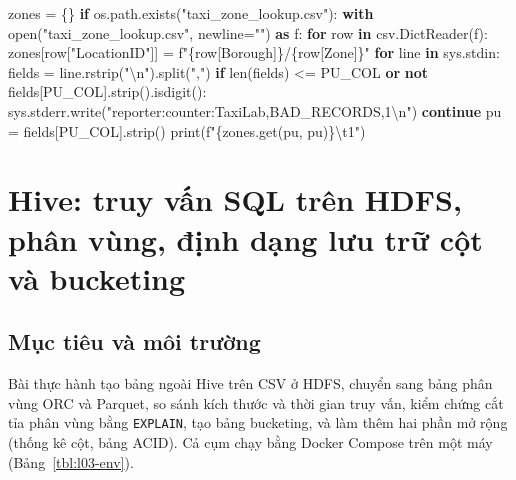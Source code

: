 \documentclass[
  12pt,
  a4paper,
]{report}
\newenvironment{Shaded}{}{}
\newcommand{\BuiltInTok}[1]{\textcolor[rgb]{0.00,0.50,0.00}{#1}}
\newcommand{\CharTok}[1]{\textcolor[rgb]{0.25,0.44,0.63}{#1}}
\newcommand{\ControlFlowTok}[1]{\textcolor[rgb]{0.00,0.44,0.13}{\textbf{#1}}}
\newcommand{\ImportTok}[1]{\textcolor[rgb]{0.00,0.50,0.00}{\textbf{#1}}}
\newcommand{\KeywordTok}[1]{\textcolor[rgb]{0.00,0.44,0.13}{\textbf{#1}}}
\newcommand{\NormalTok}[1]{#1}
\newcommand{\OperatorTok}[1]{\textcolor[rgb]{0.40,0.40,0.40}{#1}}
\newcommand{\SpecialCharTok}[1]{\textcolor[rgb]{0.25,0.44,0.63}{#1}}
\newcommand{\SpecialStringTok}[1]{\textcolor[rgb]{0.73,0.40,0.53}{#1}}
\newcommand{\StringTok}[1]{\textcolor[rgb]{0.25,0.44,0.63}{#1}}
\begin{document}
\begin{Shaded}
\begin{Highlighting}[]
\NormalTok{zones }\OperatorTok{=}\NormalTok{ \{\}}
\ControlFlowTok{if}\NormalTok{ os.path.exists(}\StringTok{"taxi\_zone\_lookup.csv"}\NormalTok{):}
    \ControlFlowTok{with} \BuiltInTok{open}\NormalTok{(}\StringTok{"taxi\_zone\_lookup.csv"}\NormalTok{, newline}\OperatorTok{=}\StringTok{""}\NormalTok{) }\ImportTok{as}\NormalTok{ f:}
        \ControlFlowTok{for}\NormalTok{ row }\KeywordTok{in}\NormalTok{ csv.DictReader(f):}
\NormalTok{            zones[row[}\StringTok{"LocationID"}\NormalTok{]] }\OperatorTok{=} \SpecialStringTok{f"}\SpecialCharTok{\{}\NormalTok{row[}\StringTok{\textquotesingle{}Borough\textquotesingle{}}\NormalTok{]}\SpecialCharTok{\}}\SpecialStringTok{/}\SpecialCharTok{\{}\NormalTok{row[}\StringTok{\textquotesingle{}Zone\textquotesingle{}}\NormalTok{]}\SpecialCharTok{\}}\SpecialStringTok{"}
\ControlFlowTok{for}\NormalTok{ line }\KeywordTok{in}\NormalTok{ sys.stdin:}
\NormalTok{    fields }\OperatorTok{=}\NormalTok{ line.rstrip(}\StringTok{"}\CharTok{\textbackslash{}n}\StringTok{"}\NormalTok{).split(}\StringTok{","}\NormalTok{)}
    \ControlFlowTok{if} \BuiltInTok{len}\NormalTok{(fields) }\OperatorTok{\textless{}=}\NormalTok{ PU\_COL }\KeywordTok{or} \KeywordTok{not}\NormalTok{ fields[PU\_COL].strip().isdigit():}
\NormalTok{        sys.stderr.write(}\StringTok{"reporter:counter:TaxiLab,BAD\_RECORDS,1}\CharTok{\textbackslash{}n}\StringTok{"}\NormalTok{)}
        \ControlFlowTok{continue}
\NormalTok{    pu }\OperatorTok{=}\NormalTok{ fields[PU\_COL].strip()}
    \BuiltInTok{print}\NormalTok{(}\SpecialStringTok{f"}\SpecialCharTok{\{}\NormalTok{zones}\SpecialCharTok{.}\NormalTok{get(pu, pu)}\SpecialCharTok{\}}\CharTok{\textbackslash{}t}\SpecialStringTok{1"}\NormalTok{)}
\end{Highlighting}
\end{Shaded}

\chapter{Hive: truy vấn SQL trên HDFS, phân vùng, định dạng lưu trữ cột
và bucketing}\label{sec:l03}

\section{Mục tiêu và môi trường}\label{sec:l03-intro}

Bài thực hành tạo bảng ngoài Hive trên CSV ở HDFS, chuyển sang bảng phân
vùng ORC và Parquet, so sánh kích thước và thời gian truy vấn, kiểm
chứng cắt tỉa phân vùng bằng \texttt{EXPLAIN}, tạo bảng bucketing, và
làm thêm hai phần mở rộng (thống kê cột, bảng ACID). Cả cụm chạy bằng
Docker Compose trên một máy (Bảng~\ref{tbl:l03-env}).
\end{document}

